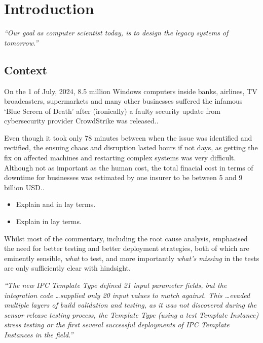 \chapter{Introduction}\label{chap:intro}

\emph{“Our goal as computer scientist today, is to design the legacy systems of tomorrow.”}
\vspace{-1.5em}
\begin{flushright}
\end{flushright}

\margintoc%

\section{Context}

On the 1 of July, 2024, 8.5 million Windows computers inside banks, airlines, TV
broadcasters, supermarkets and many other businesses suffered the infamous `Blue Screen of
Death' after (ironically) a faulty security update from cybersecurity
provider CrowdStrike was released..

Even though it took only 78 minutes between when the issue was identified and
rectified, the ensuing chaos and disruption lasted hours if not days, as getting
the fix on affected machines and restarting complex systems was very difficult.
Although not as important as the human cost, the total finacial cost in terms
of downtime for businesses was estimated by one insurer to be between 5 and 9
billion USD..

\begin{itemize}
    \item Explain  and  in lay terms.
    \item Explain  in lay terms.
\end{itemize}

Whilst most of the commentary, including the root cause
analysis, emphasised the need for better testing
and better deployment strategies, both of which are eminently sensible,
\emph{what} to test, and more importantly \emph{what's missing} in the tests
are only sufficiently clear with hindsight.

\emph{%
``The new IPC Template Type defined 21 input parameter fields, but the
integration code \ldots supplied only 20 input values to match against. This
\ldots evaded multiple layers of build validation and testing, as it was not
discovered during the sensor release testing process, the Template Type (using
a test Template Instance) stress testing or the first several successful
deployments of IPC Template Instances in the field.''
}

